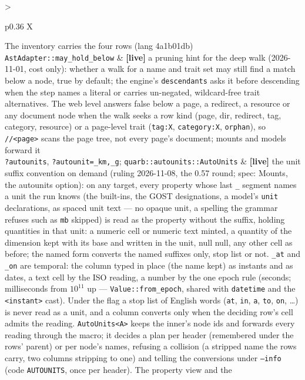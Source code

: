 \documentclass{report}
\newcommand{\live}{\textbf{\textcolor{blue!60!black}{[live]}}\xspace}
\begin{document}
\begin{xltabular}{\textwidth}{>{\raggedright\arraybackslash}p{0.36\textwidth} X}
    The inventory carries the four rows (lang 4a1b01db) \\
\texttt{AstAdapter::may\_hold\_below}
  & \live a pruning hint for the deep walk (2026-11-01, cost only):
    whether a walk for a name and trait set may still find a match
    below a node, true by default; the engine's
    \texttt{descendants} asks it before descending when the step
    names a literal or carries un-negated, wildcard-free trait
    alternatives. The web level answers false below a page, a
    redirect, a resource or any document node when the walk seeks a
    row kind (page, dir, redirect, tag, category, resource) or a
    page-level trait (\texttt{tag:X}, \texttt{category:X},
    \texttt{orphan}), so \texttt{//<page>} scans the page tree, not
    every page's document; mounts and models forward it \\
\texttt{?autounits}, \texttt{?autounit=\_km,\_g}; \texttt{quarb::autounits::AutoUnits}
  & \live the unit suffix convention on demand (ruling 2026-11-08, the
    0.57 round; spec: Mounts, the autounits option): on any target,
    every property whose last \texttt{\_} segment names a unit the run
    knows (the built-ins, the GOST designations, a model's
    \texttt{unit} declarations, as spaced unit text — no opaque unit, a
    spelling the grammar refuses such as \texttt{mb} skipped) is read
    as the property without the suffix, holding quantities in that
    unit: a numeric cell or numeric text minted, a quantity of the
    dimension kept with its base and written in the unit, null null,
    any other cell as before; the named form converts the named
    suffixes only, stop list or not. \texttt{\_at} and \texttt{\_on}
    are temporal: the column typed in place (the name kept) as
    instants and as dates, a text cell by the ISO reading, a number by
    the one epoch rule (seconds; milliseconds from $10^{11}$ up —
    \texttt{Value::from\_epoch}, shared with \texttt{datetime} and the
    \texttt{<instant>} cast). Under the flag a stop list of English
    words (\texttt{at}, \texttt{in}, \texttt{a}, \texttt{to}, \texttt{on}, \ldots)
    is never read as a unit, and a column converts only when the
    deciding row's cell admits the reading. \texttt{AutoUnits<A>}
    keeps the inner's node ids and forwards every reading through
    the macro; it decides a plan per header (remembered under the
    rows' parent) or per node's names, refusing a collision (a
    stripped name the rows carry, two columns stripping to one) and
    telling the conversions under \texttt{--info} (code
    \texttt{AUTOUNITS}, once per header). The property view and the

\end{xltabular}
\end{document}
